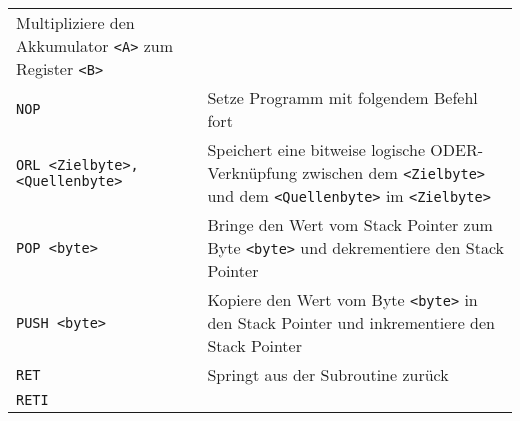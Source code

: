 \begin{longtable}[c]{@{}ll@{}}
\begin{minipage}[t]{0.69\columnwidth}
Multipliziere den Akkumulator \texttt{<A>} zum Register \texttt{<B>}
\strut\end{minipage}\tabularnewline
\begin{minipage}[t]{0.25\columnwidth}\raggedright\strut
\texttt{NOP}
\strut\end{minipage} & \begin{minipage}[t]{0.69\columnwidth}\raggedright\strut
Setze Programm mit folgendem Befehl fort
\strut\end{minipage}\tabularnewline
\begin{minipage}[t]{0.25\columnwidth}\raggedright\strut
\texttt{ORL <Zielbyte>,} \texttt{<Quellenbyte>}
\strut\end{minipage} & \begin{minipage}[t]{0.69\columnwidth}\raggedright\strut
Speichert eine bitweise logische ODER-Verknüpfung zwischen dem \texttt{<Zielbyte>} und dem
\texttt{<Quellenbyte>} im \texttt{<Zielbyte>}
\strut\end{minipage}\tabularnewline
\begin{minipage}[t]{0.25\columnwidth}\raggedright\strut
\texttt{POP <byte>}
\strut\end{minipage} & \begin{minipage}[t]{0.69\columnwidth}\raggedright\strut
Bringe den Wert vom Stack Pointer zum Byte \texttt{<byte>} und dekrementiere den Stack Pointer
\strut\end{minipage}\tabularnewline
\begin{minipage}[t]{0.25\columnwidth}\raggedright\strut
\texttt{PUSH <byte>}
\strut\end{minipage} & \begin{minipage}[t]{0.69\columnwidth}\raggedright\strut
Kopiere den Wert vom Byte \texttt{<byte>} in den Stack Pointer und inkrementiere den Stack
Pointer
\strut\end{minipage}\tabularnewline
\begin{minipage}[t]{0.25\columnwidth}\raggedright\strut
\texttt{RET}
\strut\end{minipage} & \begin{minipage}[t]{0.69\columnwidth}\raggedright\strut
Springt aus der Subroutine zurück
\strut\end{minipage}\tabularnewline
\begin{minipage}[t]{0.25\columnwidth}\raggedright\strut
\texttt{RETI}
\strut\end{minipage} & \begin{minipage}[t]{0.69\columnwidth}\raggedright\strut

\end{minipage}
\end{longtable}
